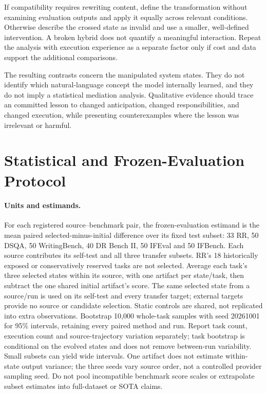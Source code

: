 If compatibility requires rewriting content, define the transformation without examining evaluation outputs and apply it equally across relevant conditions. Otherwise describe the crossed state as invalid and use a smaller, well-defined intervention. A broken hybrid does not quantify a meaningful interaction. Repeat the analysis with execution experience as a separate factor only if cost and data support the additional comparisons.

The resulting contrasts concern the manipulated system states. They do not identify which natural-language concept the model internally learned, and they do not imply a statistical mediation analysis. Qualitative evidence should trace an committed lesson to changed anticipation, changed responsibilities, and changed execution, while presenting counterexamples where the lesson was irrelevant or harmful.



\section{Statistical and Frozen-Evaluation Protocol}

\paragraph{Units and estimands.}
For each registered source--benchmark pair, the frozen-evaluation estimand is the mean paired selected-minus-initial difference over its fixed test subset: 33 RR, 50 DSQA, 50 WritingBench, 40 DR Bench II, 50 IFEval and 50 IFBench. Each source contributes its self-test and all three transfer subsets. RR's 18 historically exposed or conservatively reserved tasks are not selected. Average each task's three selected states within its source, with one artifact per state/task, then subtract the one shared initial artifact's score. The same selected state from a source/run is used on its self-test and every transfer target; external targets provide no source or candidate selection. Static controls are shared, not replicated into extra observations. Bootstrap 10,000 whole-task samples with seed 20261001 for 95\% intervals, retaining every paired method and run. Report task count, execution count and source-trajectory variation separately; task bootstrap is conditional on the evolved states and does not remove between-run variability. Small subsets can yield wide intervals. One artifact does not estimate within-state output variance; the three seeds vary source order, not a controlled provider sampling seed. Do not pool incompatible benchmark score scales or extrapolate subset estimates into full-dataset or SOTA claims.

